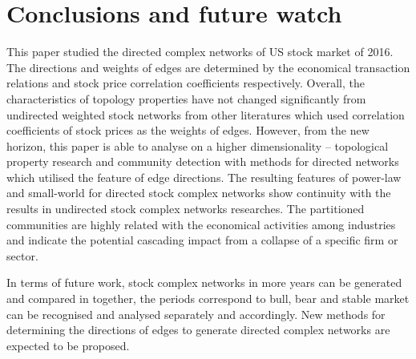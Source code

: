 \chapter[Conclusions]{Conclusions and future watch}
\label{cpt:conclude}
This paper studied the directed complex networks of US stock market of 2016. The directions and weights of edges are determined by the economical transaction relations and stock price correlation coefficients respectively. Overall, the characteristics of topology properties have not changed significantly from undirected weighted stock networks from other literatures which used correlation coefficients of stock prices as the weights of edges. However, from the new horizon, this paper is able to analyse on a higher dimensionality -- topological property research and community detection with methods for directed networks which utilised the feature of edge directions. The resulting features of power-law and small-world for directed stock complex networks show continuity with the results in undirected stock complex networks researches. The partitioned communities are highly related with the economical activities among industries and indicate the potential cascading impact from a collapse of a specific firm or sector.

In terms of future work, stock complex networks in more years can be generated and compared in together, the periods correspond to bull, bear and stable market can be recognised and analysed separately and accordingly. New methods for determining the directions of edges to generate directed complex networks are expected to be proposed.
